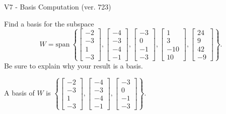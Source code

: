 \begin{exercise}
  \begin{exerciseTitle}V7 - Basis Computation (ver. 723)\end{exerciseTitle}
  \begin{exerciseStatement}
    Find a basis for the subspace 
\[W=\mathrm{span}\ \left\{\left[\begin{array}{r}
-2 \\
-3 \\
1 \\
-3
\end{array}\right] , \left[\begin{array}{r}
-4 \\
-3 \\
-4 \\
-1
\end{array}\right] , \left[\begin{array}{r}
-3 \\
0 \\
-1 \\
-3
\end{array}\right] , \left[\begin{array}{r}
1 \\
3 \\
-10 \\
10
\end{array}\right] , \left[\begin{array}{r}
24 \\
9 \\
42 \\
-9
\end{array}\right]\right\}.\]
 Be sure to explain why your result is a basis.


  \end{exerciseStatement}
  \begin{exerciseAnswer}
   A basis of \(W\) is  \(\left\{\left[\begin{array}{r}
-2 \\
-3 \\
1 \\
-3
\end{array}\right] , \left[\begin{array}{r}
-4 \\
-3 \\
-4 \\
-1
\end{array}\right] , \left[\begin{array}{r}
-3 \\
0 \\
-1 \\
-3
\end{array}\right]\right\}\).
  


  \end{exerciseAnswer}
\end{exercise}
